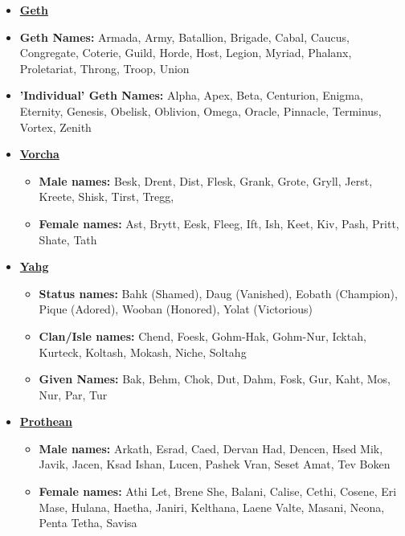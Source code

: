 \begin{scifitablebox}[screenbox,title=\textcolor{PanelGlow}{Names}]
\begin{itemize}
\begin{itemize}
    \item \textbf{Female Names:} Apenine, Adrechia, Banim, Della, Erakis, Famisa, Fophe, Igosin, Iraphi, Kranine, Krathe, Okhefin, Pravile, Ramye
    \item \textbf{Family Names:} Can'dabar, Das'codah, Dhen'gess, Dran'fapos, Ghapsacan, Gronnopos, Kasbovran, Khognalak, Krak'gork, Pec'bawen, Sanrowar
  \end{itemize}
  \item \textbf{\underline{Geth}}
  \item \textbf{Geth Names:} Armada, Army, Batallion, Brigade, Cabal, Caucus, Congregate, Coterie, Guild, Horde, Host, Legion, Myriad, Phalanx, Proletariat, Throng, Troop, Union
  \item \textbf{'Individual' Geth Names:} Alpha, Apex, Beta, Centurion, Enigma, Eternity, Genesis, Obelisk, Oblivion, Omega, Oracle, Pinnacle, Terminus, Vortex, Zenith
  \item \textbf{\underline{Vorcha}}
  \begin{itemize}
    \item \textbf{Male names:} Besk, Drent, Dist, Flesk, Grank, Grote, Gryll, Jerst, Kreete, Shisk, Tirst, Tregg,
    \item \textbf{Female names:} Ast, Brytt, Eesk, Fleeg, Ift, Ish, Keet, Kiv, Pash, Pritt, Shate, Tath
  \end{itemize}
  \item \textbf{\underline{Yahg}}
  \begin{itemize}
    \item \textbf{Status names:} Bahk (Shamed), Daug (Vanished), Eobath (Champion), Pique (Adored), Wooban (Honored), Yolat (Victorious)
    \item \textbf{Clan/Isle names:} Chend, Foesk, Gohm-Hak, Gohm-Nur, Icktah, Kurteck, Koltash, Mokash, Niche, Soltahg
    \item \textbf{Given Names:} Bak, Behm, Chok, Dut, Dahm, Fosk, Gur, Kaht, Mos, Nur, Par, Tur
  \end{itemize}
  \item \textbf{\underline{Prothean}}
  \begin{itemize}
    \item \textbf{Male names:} Arkath, Esrad, Caed, Dervan Had, Dencen, Hsed Mik, Javik, Jacen, Ksad Ishan, Lucen, Pashek Vran, Seset Amat, Tev Boken
    \item \textbf{Female names:} Athi Let, Brene She, Balani, Calise, Cethi, Cosene, Eri Mase, Hulana, Haetha, Janiri, Kelthana, Laene Valte, Masani, Neona, Penta Tetha, Savisa

\end{itemize}
\end{itemize}
\end{scifitablebox}
